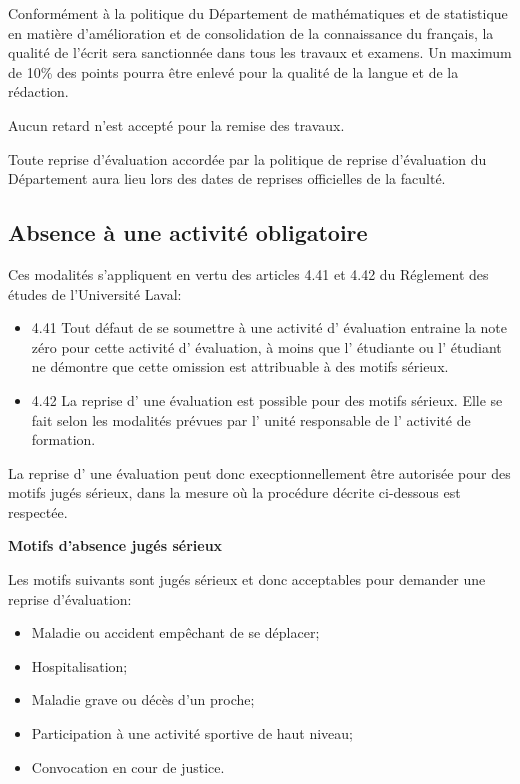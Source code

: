 \documentclass[
  french,
  letterpaper,
  DIV=11,
  numbers=noendperiod]{scrartcl}
\providecommand{\tightlist}{%
  \setlength{\itemsep}{0pt}\setlength{\parskip}{0pt}}
\begin{document}
Conformément à la politique du Département de mathématiques et de
statistique en matière d'amélioration et de consolidation de la
connaissance du français, la qualité de l'écrit sera sanctionnée dans
tous les travaux et examens. Un maximum de 10\% des points pourra être
enlevé pour la qualité de la langue et de la rédaction.

Aucun retard n'est accepté pour la remise des travaux.

Toute reprise d'évaluation accordée par la politique de reprise
d'évaluation du Département aura lieu lors des dates de reprises
officielles de la faculté.

\subsection{Absence à une activité
obligatoire}\label{absence-uxe0-une-activituxe9-obligatoire}

Ces modalités s'appliquent en vertu des articles 4.41 et 4.42 du
Réglement des études de l'Université Laval:

\begin{itemize}
\tightlist
\item
  4.41 Tout défaut de se soumettre à une activité d' évaluation entraine
  la note zéro pour cette activité d' évaluation, à moins que l'
  étudiante ou l' étudiant ne démontre que cette omission est
  attribuable à des motifs sérieux.
\item
  4.42 La reprise d' une évaluation est possible pour des motifs
  sérieux. Elle se fait selon les modalités prévues par l' unité
  responsable de l' activité de formation.
\end{itemize}

La reprise d' une évaluation peut donc execptionnellement être autorisée
pour des motifs jugés sérieux, dans la mesure où la procédure décrite
ci-dessous est respectée.

\textbf{Motifs d'absence jugés sérieux}

Les motifs suivants sont jugés sérieux et donc acceptables pour demander
une reprise d'évaluation:

\begin{itemize}
\tightlist
\item
  Maladie ou accident empêchant de se déplacer;
\item
  Hospitalisation;
\item
  Maladie grave ou décès d'un proche;
\item
  Participation à une activité sportive de haut niveau;
\item
  Convocation en cour de justice.
\end{itemize}
\end{document}
